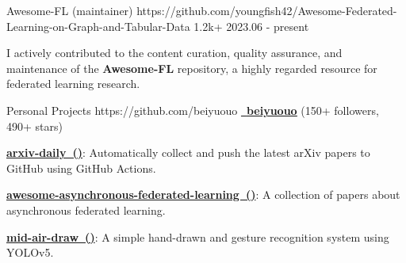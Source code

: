 \begin{cventries}

\cvproject
{Awesome-FL (maintainer)} %
{https://github.com/youngfish42/Awesome-Federated-Learning-on-Graph-and-Tabular-Data}
{1.2k+} %
{2023.06 - present} %
{
\begin{cvitems} %
\item {I actively contributed to the content curation, quality assurance, and maintenance of the \textbf{Awesome-FL} repository, a highly regarded resource for federated learning research. }
\end{cvitems}
} %



\cvproject
{Personal Projects} %
{https://github.com/beiyuouo} %
{} %
{\href{https://github.com/beiyuouo}{\textcolor{text}{\faGithub~\textbf{\underline{beiyuouo}}}} (150+ followers, 490+ stars)} %
{
\begin{cvitems} %
\item {\href{https://github.com/beiyuouo/arxiv-daily}{\textbf{arxiv-daily~()}}: Automatically collect and push the latest arXiv papers to GitHub using GitHub Actions.}
\item {\href{https://github.com/beiyuouo/awesome-asynchronous-federated-learning}{\textbf{awesome-asynchronous-federated-learning~()}}: A collection of papers about asynchronous federated learning.}
\item {\href{https://github.com/beiyuouo/mid-air-draw}{\textbf{mid-air-draw~()}}: A simple hand-drawn and gesture recognition system using YOLOv5.}
\end{cvitems}
} %


\end{cventries}
